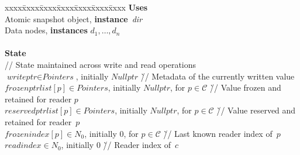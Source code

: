 \documentclass[oribibl]{llncs}
\theoremstyle{definition-boldhead}
\newcommand{\var}[1]{\textit{#1}}
\newcommand{\instance}[1]{\textbf{instance}~\var{#1}}
\newcommand{\clientset}{\ensuremath{\mathcal{C}}\xspace}
\newcommand{\nodes}{nodes\xspace}
\begin{document}
\begin{alg}\small
\begin{tabbing}
xxxx\=xxxx\=xxxx\=xxxx\=xxxx\=xxxx\=xxxx\kill
\if\submit\no
  \textbf{Uses} \\
  \> Atomic snapshot object, \instance{dir} \\
  \> Data \nodes, \textbf{instances} $d_1, \dots, d_n$ \\
  \\
\fi
  \textbf{State} \\
  \> // State maintained across write and read operations \\

\> $\var{writeptr} \in \var{Pointers}$, initially $\var{Nullptr}$
     \` // Metadata of the currently written value \\
  \> $\var{frozenptrlist}[p] \in \var{Pointers}$, initially $\var{Nullptr}$,
     for $p \in \clientset$
     \` // Value frozen and retained for reader $p$ \\
  \> $\var{reservedptrlist}[p] \in \var{Pointers}$, initially $\var{Nullptr}$,
     for $p \in \clientset$
     \` // Value reserved and retained for reader~$p$ \\
  \> $\var{frozenindex}[p] \in N_0$, initially 0, for $p \in \clientset$
     \` // Last known reader index of~$p$ \\

\> $\var{readindex} \in N_0$, initially 0
  \` // Reader index of~$c$ \\


\end{tabbing}
\end{alg}
\end{document}
